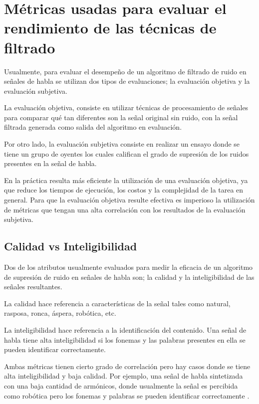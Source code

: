 \section{Métricas usadas para evaluar el rendimiento de las técnicas de filtrado}
\label{sec:metrics}

Usualmente, para evaluar el desempeño de un algoritmo de filtrado de ruido en señales de habla se utilizan dos tipos de evaluaciones; la evaluación objetiva y la evaluación subjetiva.

La evaluación objetiva, consiste en utilizar técnicas de procesamiento de señales para comparar qué tan diferentes son la señal original sin ruido, con la señal filtrada generada como salida del algoritmo en evaluación.

Por otro lado, la evaluación subjetiva consiste en realizar un ensayo donde se tiene un grupo de oyentes los cuales califican el grado de supresión de los ruidos presentes en la señal de habla.

En la práctica resulta más eficiente la utilización de una evaluación objetiva, ya que reduce los tiempos de ejecución, los costos y la complejidad de la tarea en general. Para que la evaluación objetiva resulte efectiva es imperioso la utilización de métricas que tengan una alta correlación con los resultados de la evaluación subjetiva.

\subsection{Calidad vs Inteligibilidad}
\label{sec:intelligibility_vs_quality}

Dos de los atributos usualmente evaluados para medir la eficacia de un algoritmo de supresión de ruido en señales de habla son; la calidad y la inteligibilidad de las señales resultantes.

La calidad hace referencia a características de la señal tales como natural, rasposa, ronca, áspera, robótica, etc.

La inteligibilidad hace referencia a la identificación del contenido. Una señal de habla tiene alta inteligibilidad si los fonemas y las palabras presentes en ella se pueden identificar correctamente.

Ambas métricas tienen cierto grado de correlación pero hay casos donde se tiene alta inteligibilidad y baja calidad. Por ejemplo, una señal de habla sintetizada con una baja cantidad de armónicos, donde usualmente la señal es percibida como robótica pero los fonemas y palabras se pueden identificar correctamente \cite{philipos_book_speech_enhancement}. 

